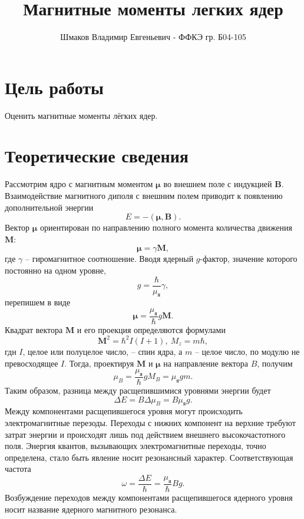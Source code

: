 \documentclass[a4paper, 14pt]{article}
\title{\textcolor{main_title}{Магнитные моменты легких ядер}}
\author{Шмаков Владимир Евгеньевич - ФФКЭ гр. Б04-105}
\begin{document}
\maketitle



\section*{\textcolor{header}{Цель работы}}

Оценить магнитные моменты лёгких ядер. 

\section*{\textcolor{header}{Теоретические сведения}}

Рассмотрим ядро с магнитным моментом $\boldsymbol{\mu}$ во внешнем поле с индукцией $\mathbf{B}$. Взаимодействие магнитного диполя с внешним полем приводит к появлению дополнительной энергии 
\[
E = -(\boldsymbol{\mu},\mathbf{B}).
\]
Вектор $\boldsymbol{\mu}$ ориентирован по направлению полного момента количества движения $\mathbf{M}$:
\[
\boldsymbol{\mu} = \gamma \mathbf{M},
\]
где $\gamma$ -- гиромагнитное соотношение. Вводя ядерный $g$-фактор, значение которого постоянно на одном уровне,
\[
g = \dfrac{\hbar}{\mu_\text{я}}\gamma,
\]
перепишем в виде
\[
\boldsymbol{\mu} = \dfrac{\mu_\text{я}}{\hbar}g\mathbf{M}.
\]
Квадрат вектора $\mathbf{M}$ и его проекция определяются формулами
\[
\mathbf{M}^2 = \hbar^2 I(I+1),~M_z = m\hbar,
\]
гдн $I$, целое или полуцелое число, -- спин ядра, а $m$ -- целое число, по модулю не превосходящее $I$. Тогда, проектируя $\mathbf{M}$ и $\boldsymbol{\mu}$ на направление вектора $B$, получим
\[
\mu_B = \dfrac{\mu_\text{я}}{\hbar}g M_B = \mu_\text{я} g m.
\]
Таким образом, разница между расщепившимися уровнями энергии будет
\[
\Delta E = B\Delta \mu_B = B \mu_\text{я} g.
\]
Между компонентами расщепившегося уровня могут происходить электромагнитные перезоды. Переходы с нижних компонент на верхние требуют затрат энергии и происходят лишь под действием внешнего высокочастотного поля. Энергия квантов, вызывающих электромагнитные переходы, точно определена, стало быть явление носит резонансный характер. Соответствующая частота 
\begin{equation}
\omega = \dfrac{\Delta E}{\hbar} = \dfrac{\mu_\text{я}}{\hbar}Bg.
\end{equation}
Возбуждение переходов между компонентами расщепившегося ядерного уровня носит название \textcolor{defenition}{ядерного магнитного резонанса}.
\end{document}
